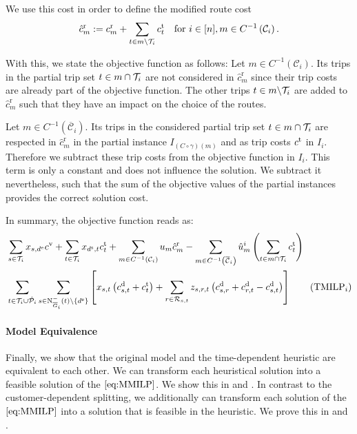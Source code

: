 We use this cost in order to define the modified route cost 
\begin{align*}
	\hat{c}^{\operatorname{r}}_m := c^{\operatorname{r}}_m + \sum_{t\in m\backslash\mathcal{T}_i}c^{\operatorname{t}}_t && \text{for } i\in[n], m\in C^{-1}\left(\mathcal{C}_i\right).
\end{align*}

With this, we state the objective function as follows: Let ${m\in C^{-1}\left(\mathcal{C}_i\right)}$. Its trips in the partial trip set ${t\in m\cap\mathcal{T}_i}$ are not considered in $\hat{c}^{\operatorname{r}}_m$ since their trip costs are already part of the objective function. The other trips ${t\in m\backslash\mathcal{T}_i}$ are added to $\hat{c}^{\operatorname{r}}_m$ such that they have an impact on the choice of the routes.

Let ${m\in C^{-1}\left(\overline{\mathcal{C}}_i\right)}$. Its trips in the considered partial trip set ${t\in m\cap\mathcal{T}_i}$ are respected in $\hat{c}^{\operatorname{r}}_m$ in the partial instance $I_{\left(C\circ \gamma\right)(m)}$ and as trip costs $c^{\operatorname{t}}$ in $I_i$. Therefore we subtract these trip costs from the objective function in $I_i$. This term is only a constant and does not influence the solution. We subtract it nevertheless, such that the sum of the objective values of the partial instances provides the correct solution cost.

In summary, the objective function reads as: 
\begin{align}
	& \sum_{s\in\Ti} x_{s,\de}\cv + \sum_{t\in\Ti} x_{\ds, t}\ct_t + \sum_{m\in C^{-1}\left(\mathcal{C}_i\right)} u_m \hat{c}^{\operatorname{r}}_m - \sum_{m\in C^{-1}\left(\overline{\mathcal{C}}_i\right)} \hat{u}^i_m \left(\sum_{t\in m\cap\Ti} \ct_t\right)\nonumber \\
	& \sum_{t\in\Ti\cup\Phat_i}\sum_{s\in\Ninoi(t)\backslash\left\{\ds\right\}}\left[x_{s,t}\left(\cd_{s,t}+\ct_t\right)+\sum_{r\in\Rst}z_{s,r,t}\left(\cd_{s,r}+\cd_{r,t}-\cd_{s,t}\right)\right] \tag{$\operatorname{TMILP}_i$} \label{eq:TMILPi}
\end{align}

\paragraph{Model Equivalence} \parfill

Finally, we show that the original model and the time-dependent heuristic are equivalent to each other. We can transform each heuristical solution into a feasible solution of the $\eqref{eq:MMILP}$. We show this in  and . In contrast to the customer-dependent splitting, we additionally can transform each solution of the $\eqref{eq:MMILP}$ into a solution that is feasible in the heuristic. We prove this in  and .

